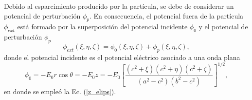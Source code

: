 \noindent Debido al esparcimiento producido por la partícula, se debe de considerar un potencial de perturbación $\phi_p$. En consecuencia, el potencial fuera de la partícula $\phi_{ext}$ está formado por la superposición del potencial incidente $\phi_0$ y el potencial de perturbación $\phi_p$
\begin{equation}
	\phi_{ext}(\xi,\eta,\zeta)=\phi_0(\xi,\eta,\zeta)+\phi_p(\xi,\eta,\zeta),    
\end{equation}
donde el potencial incidente es el potencial eléctrico asociado a una onda plana
\begin{equation}
	\phi_0=-E_0 r\cos\theta=-E_0 z=-E_0\left[\frac{(c^2+\xi)(c^2+\eta)(c^2+\zeta)}{(a^2-c^2)(b^2-c^2)}\right]^{1/2},
	\label{pot_0}
\end{equation}
en donde se empleó la Ec. (\ref{z_elips}).\\

